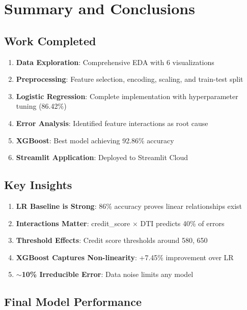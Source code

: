\documentclass[12pt,a4paper]{article}
\begin{document}
\newpage

\section{Summary and Conclusions}

\subsection{Work Completed}

\begin{enumerate}
    \item \textbf{Data Exploration}: Comprehensive EDA with 6 visualizations
    \item \textbf{Preprocessing}: Feature selection, encoding, scaling, and train-test split
    \item \textbf{Logistic Regression}: Complete implementation with hyperparameter tuning (86.42\%)
    \item \textbf{Error Analysis}: Identified feature interactions as root cause
    \item \textbf{XGBoost}: Best model achieving 92.86\% accuracy
    \item \textbf{Streamlit Application}: Deployed to Streamlit Cloud
\end{enumerate}

\subsection{Key Insights}

\begin{enumerate}
    \item \textbf{LR Baseline is Strong}: 86\% accuracy proves linear relationships exist
    \item \textbf{Interactions Matter}: credit\_score $\times$ DTI predicts 40\% of errors
    \item \textbf{Threshold Effects}: Credit score thresholds around 580, 650
    \item \textbf{XGBoost Captures Non-linearity}: +7.45\% improvement over LR
    \item \textbf{$\sim$10\% Irreducible Error}: Data noise limits any model
\end{enumerate}

\subsection{Final Model Performance}
\end{document}
